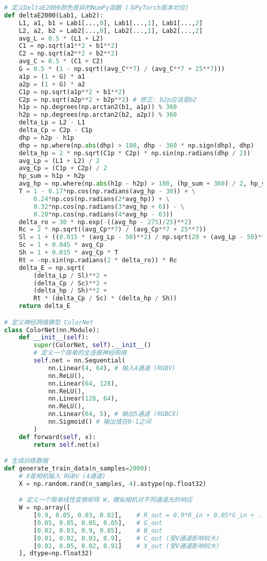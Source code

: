 \begin{lstlisting}[language=Python]
# 定义DeltaE2000颜色差异的NumPy函数 (与PyTorch版本对应)
def deltaE2000(Lab1, Lab2):
    L1, a1, b1 = Lab1[...,0], Lab1[...,1], Lab1[...,2]
    L2, a2, b2 = Lab2[...,0], Lab2[...,1], Lab2[...,2]
    avg_L = 0.5 * (L1 + L2)
    C1 = np.sqrt(a1**2 + b1**2)
    C2 = np.sqrt(a2**2 + b2**2)
    avg_C = 0.5 * (C1 + C2)
    G = 0.5 * (1 - np.sqrt((avg_C**7) / (avg_C**7 + 25**7)))
    a1p = (1 + G) * a1
    a2p = (1 + G) * a2
    C1p = np.sqrt(a1p**2 + b1**2)
    C2p = np.sqrt(a2p**2 + b2p**2) # 修正: b2p应该是b2
    h1p = np.degrees(np.arctan2(b1, a1p)) % 360
    h2p = np.degrees(np.arctan2(b2, a2p)) % 360
    delta_Lp = L2 - L1
    delta_Cp = C2p - C1p
    dhp = h2p - h1p
    dhp = np.where(np.abs(dhp) > 180, dhp - 360 * np.sign(dhp), dhp)
    delta_hp = 2 * np.sqrt(C1p * C2p) * np.sin(np.radians(dhp / 2))
    avg_Lp = (L1 + L2) / 2
    avg_Cp = (C1p + C2p) / 2
    hp_sum = h1p + h2p
    avg_hp = np.where(np.abs(h1p - h2p) > 180, (hp_sum + 360) / 2, hp_sum / 2)
    T = 1 - 0.17*np.cos(np.radians(avg_hp - 30)) + \
        0.24*np.cos(np.radians(2*avg_hp)) + \
        0.32*np.cos(np.radians(3*avg_hp + 6)) - \
        0.20*np.cos(np.radians(4*avg_hp - 63))
    delta_ro = 30 * np.exp(-((avg_hp - 275)/25)**2)
    Rc = 2 * np.sqrt((avg_Cp**7) / (avg_Cp**7 + 25**7))
    Sl = 1 + ((0.015 * (avg_Lp - 50)**2) / np.sqrt(20 + (avg_Lp - 50)**2))
    Sc = 1 + 0.045 * avg_Cp
    Sh = 1 + 0.015 * avg_Cp * T
    Rt = -np.sin(np.radians(2 * delta_ro)) * Rc
    delta_E = np.sqrt(
        (delta_Lp / Sl)**2 +
        (delta_Cp / Sc)**2 +
        (delta_hp / Sh)**2 +
        Rt * (delta_Cp / Sc) * (delta_hp / Sh))
    return delta_E

# 定义神经网络模型 ColorNet
class ColorNet(nn.Module):
    def __init__(self):
        super(ColorNet, self).__init__()
        # 定义一个简单的全连接神经网络
        self.net = nn.Sequential(
            nn.Linear(4, 64), # 输入4通道 (RGBV)
            nn.ReLU(),
            nn.Linear(64, 128),
            nn.ReLU(),
            nn.Linear(128, 64),
            nn.ReLU(),
            nn.Linear(64, 5), # 输出5通道 (RGBCX)
            nn.Sigmoid() # 输出值在0-1之间
        )
    def forward(self, x):
        return self.net(x)

# 生成训练数据
def generate_train_data(n_samples=2000):
    # X是相机输入 RGBV (4通道)
    X = np.random.rand(n_samples, 4).astype(np.float32)

    # 定义一个简单线性变换矩阵 W，模拟相机对不同通道光的响应
    W = np.array([
        [0.9, 0.05, 0.03, 0.02],    # R_out = 0.9*R_in + 0.05*G_in + ...
        [0.05, 0.85, 0.05, 0.05],   # G_out
        [0.02, 0.03, 0.9, 0.05],    # B_out
        [0.01, 0.02, 0.03, 0.9],    # C_out (受V通道影响较大)
        [0.02, 0.05, 0.02, 0.91]    # X_out (受V通道影响较大)
    ], dtype=np.float32)


\end{lstlisting}
